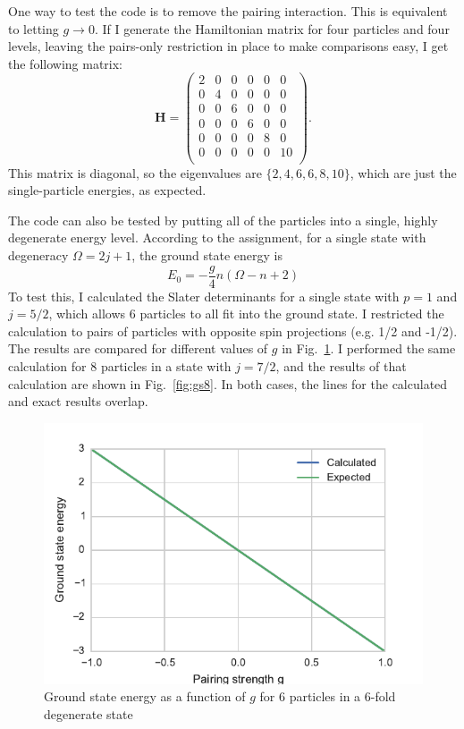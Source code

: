 \documentclass{article}
\begin{document}
	One way to test the code is to remove the pairing interaction. This is equivalent to letting $g \rightarrow 0$. If I generate the Hamiltonian matrix for four particles and four levels, leaving the pairs-only restriction in place to make comparisons easy, I get the following matrix:
	\begin{equation*}
		\mathbf{H} = \begin{pmatrix}
			2 & 0 & 0 & 0 & 0 & 0  \\
			0 & 4 & 0 & 0 & 0 & 0  \\
			0 & 0 & 6 & 0 & 0 & 0  \\
			0 & 0 & 0 & 6 & 0 & 0  \\
			0 & 0 & 0 & 0 & 8 & 0  \\
			0 & 0 & 0 & 0 & 0 & 10 \\
		\end{pmatrix}.
	\end{equation*}
	This matrix is diagonal, so the eigenvalues are $\{2, 4, 6, 6, 8, 10\}$, which are just the single-particle energies, as expected.

	The code can also be tested by putting all of the particles into a single, highly degenerate energy level. According to the assignment, for a single state with degeneracy $\Omega = 2j+1$, the ground state energy is
	\begin{equation}
		E_0 = -\frac{g}{4} n (\Omega - n + 2)
	\end{equation}
	To test this, I calculated the Slater determinants for a single state with $p=1$ and $j=5/2$, which allows 6 particles to all fit into the ground state. I restricted the calculation to pairs of particles with opposite spin projections (e.g. 1/2 and -1/2). The results are compared for different values of $g$ in Fig.~\ref{fig:gs6}. I performed the same calculation for 8 particles in a state with $j=7/2$, and the results of that calculation are shown in Fig.~\ref{fig:gs8}. In both cases, the lines for the calculated and exact results overlap.

	\begin{figure}[p]
		\centering
		\includegraphics{gs6.pdf}
		\caption{Ground state energy as a function of $g$ for 6 particles in a 6-fold degenerate state}
		\label{fig:gs6}
	\end{figure}
\end{document}

